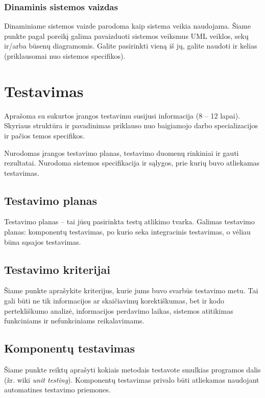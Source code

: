 \documentclass{ktuthesis}
\begin{document}
  \subsubsection{Dinaminis sistemos vaizdas}

  Dinaminiame sistemos vaizde parodoma kaip sistema veikia naudojama. Šiame
  punkte pagal poreikį galima pavaizduoti sistemos veiksmus UML veiklos, sekų
  ir/arba būsenų diagramomis. Galite pasirinkti vieną iš jų, galite naudoti ir
  kelias (priklausomai nuo sistemos specifikos).

  \section{Testavimas}

  Aprašoma su sukurtos įrangos testavimu susijusi informacija (8 – 12 lapai). Skyriaus struktūra ir pavadinimas priklauso nuo baigiamojo darbo
  specializacijos ir pačios temos specifikos.

  Nurodomas įrangos testavimo planas, testavimo duomenų rinkiniai ir gauti rezultatai. Nurodoma sistemos specifikacija ir sąlygos, prie kurių
  buvo atliekamas testavimas.

  \subsection{Testavimo planas}

  Testavimo planas – tai jūsų pasirinkta testų atlikimo tvarka. Galimas testavimo planas: komponentų testavimas, po kurio seka integracinis
  testavimas, o vėliau būna sąsajos testavimas.

  \subsection{Testavimo kriterijai}

  Šiame punkte aprašykite kriterijus, kurie jums buvo svarbūs testavimo metu. Tai gali būti ne tik informacijos ar skaičiavimų korektiškumas,
  bet ir kodo pertekliškumo analizė, informacijos perdavimo laikas, sistemos atitikimas funkciniams ir nefunkciniams reikalavimams.

  \subsection{Komponentų testavimas}

  Šiame punkte reiktų aprašyti kokiais metodais testavote smulkias programos dalis (žr. wiki \textit{unit testing}). Komponentų testavimas privalo būti
  atliekamas naudojant automatines testavimo priemones.
\end{document}
